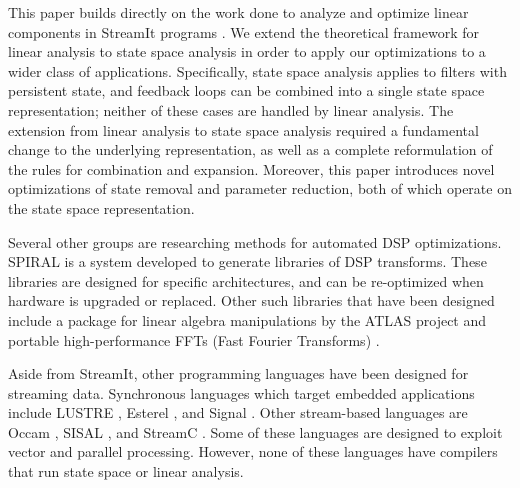 \label{sec:related}

This paper builds directly on the work done to analyze and optimize
linear components in StreamIt programs \cite{Lamb}. We extend the
theoretical framework for linear analysis to state space analysis in
order to apply our optimizations to a wider class of applications.
Specifically, state space analysis applies to filters with persistent
state, and feedback loops can be combined into a single state space
representation; neither of these cases are handled by linear analysis.
The extension from linear analysis to state space analysis required a
fundamental change to the underlying representation, as well as a
complete reformulation of the rules for combination and expansion.
Moreover, this paper introduces novel optimizations of state removal
and parameter reduction, both of which operate on the state space
representation.

Several other groups are researching methods for automated DSP
optimizations. SPIRAL \cite{Spiral} is a system developed to generate
libraries of DSP transforms. These libraries are designed for specific
architectures, and can be re-optimized when hardware is upgraded or
replaced. Other such libraries that have been designed include a
package for linear algebra manipulations by the ATLAS project
\cite{Atlas} and portable high-perfor\-mance FFTs (Fast Fourier
Transforms) \cite{fftw}.

Aside from StreamIt, other programming languages have been designed
for streaming data. Synchronous languages which target embedded
applications include LUSTRE \cite{Lustre}, Esterel \cite{Esterel}, and
Signal \cite{Signal}. Other stream-based languages are Occam
\cite{Occam}, SISAL \cite{sisal}, and StreamC \cite{streamc}.  Some of
these languages are designed to exploit vector and parallel
processing. However, none of these languages have compilers that run
state space or linear analysis.
